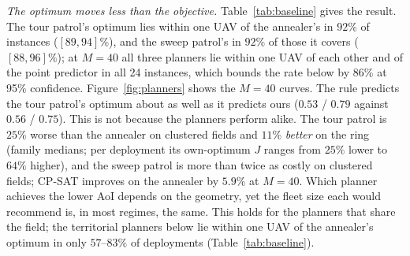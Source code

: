 \documentclass[journal,outdir=./]{IEEEtran}
\begin{document}
\textit{The optimum moves less than the objective.} Table~\ref{tab:baseline} gives the result. The tour patrol's optimum lies within one UAV of the annealer's in $92\%$ of instances ($[89,94]\%$), and the sweep patrol's in $92\%$ of those it covers ($[88,96]\%$); at $M=40$ all three planners lie within one UAV of each other and of the point predictor in all 24 instances, which bounds the rate below by $86\%$ at 95\% confidence. Figure~\ref{fig:planners} shows the $M=40$ curves. The rule predicts the tour patrol's optimum about as well as it predicts ours ($0.53$ / $0.79$ against $0.56$ / $0.75$). This is not because the planners perform alike. The tour patrol is $25\%$ worse than the annealer on clustered fields and $11\%$ \emph{better} on the ring (family medians; per deployment its own-optimum $J$ ranges from $25\%$ lower to $64\%$ higher), and the sweep patrol is more than twice as costly on clustered fields; CP-SAT improves on the annealer by $5.9\%$ at $M=40$. Which planner achieves the lower AoI depends on the geometry, yet the fleet size each would recommend is, in most regimes, the same. This holds for the planners that share the field; the territorial planners below lie within one UAV of the annealer's optimum in only $57$--$83\%$ of deployments (Table~\ref{tab:baseline}).
\end{document}
